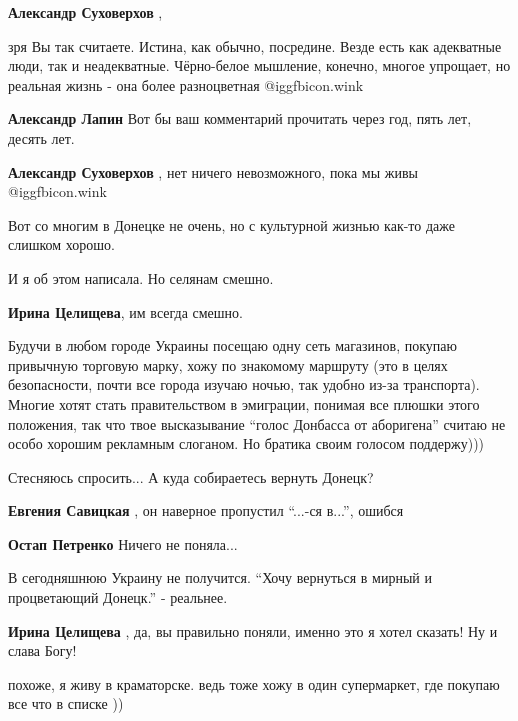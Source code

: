 \begin{itemize}
\begin{itemize}
\textbf{Александр Суховерхов} , 

зря Вы так считаете. Истина, как обычно, посредине. Везде есть как адекватные
люди, так и неадекватные. Чёрно-белое мышление, конечно, многое упрощает, но
реальная жизнь - она более разноцветная  @igg{fbicon.wink} 


\textbf{Александр Лапин} Вот бы ваш комментарий прочитать через год, пять лет, десять лет.

\textbf{Александр Суховерхов} , нет ничего невозможного, пока мы живы  @igg{fbicon.wink} 
\end{itemize} %

Вот со многим в Донецке не очень, но с культурной жизнью как-то даже слишком хорошо.

\begin{itemize} %
И я об этом написала. Но селянам смешно.

\textbf{Ирина Целищева}, им всегда смешно.
\end{itemize} %


Будучи в любом городе Украины посещаю одну сеть магазинов, покупаю привычную
торговую марку, хожу по знакомому маршруту (это в целях безопасности, почти все
города изучаю ночью, так удобно из-за транспорта). Многие хотят стать
правительством в эмиграции, понимая все плюшки этого положения, так что твое
высказывание \enquote{голос Донбасса от аборигена} считаю не особо хорошим рекламным
слоганом. Но братика своим голосом поддержу)))


Стесняюсь спросить...
А куда собираетесь вернуть Донецк?

\begin{itemize} %
\textbf{Евгения Савицкая} , он наверное пропустил \enquote{...-ся в...}, ошибся

\textbf{Остап Петренко}
Ничего не поняла...

В сегодняшнюю Украину не получится. \enquote{Хочу вернуться в мирный и процветающий Донецк.} - реальнее.

\textbf{Ирина Целищева} , да, вы правильно поняли, именно это я хотел сказать! Ну и слава Богу!
\end{itemize} %

похоже, я живу в краматорске. ведь тоже хожу в один супермаркет, где покупаю все что в списке ))


\end{itemize}

